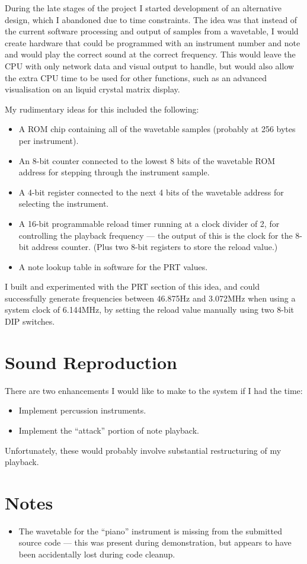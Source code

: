 During the late stages of the project I started development of an alternative design, which I 
abandoned due to time constraints.  The idea was that instead of the current software processing and 
output of samples from a wavetable, I would create hardware that could be programmed with an 
instrument number and note and would play the correct sound at the correct frequency.   This would 
leave the CPU with only network data and visual output to handle, but would also allow the extra CPU 
time to be used for other functions, such as an advanced visualisation on an liquid crystal matrix 
display.

My rudimentary ideas for this included the following:

\begin{itemize}
\item A ROM chip containing all of the wavetable samples (probably at 256 bytes per instrument).
\item An 8-bit counter connected to the lowest 8 bits of the wavetable ROM address for stepping 
through the instrument sample.
\item A 4-bit register connected to the next 4 bits of the wavetable address for selecting the 
instrument.
\item A 16-bit programmable reload timer running at a clock divider of 2, for controlling the 
playback frequency --- the output of this is the clock for the 8-bit address counter.  (Plus two 
8-bit registers to store the reload value.)
\item A note lookup table in software for the PRT values.
\end{itemize}

I built and experimented with the PRT section of this idea, and could successfully generate 
frequencies between 46.875Hz and 3.072MHz when using a system clock of 6.144MHz, by setting the 
reload value manually using two 8-bit DIP switches.

\section{Sound Reproduction}

There are two enhancements I would like to make to the system if I had the time:

\begin{itemize}
\item Implement percussion instruments.
\item Implement the ``attack'' portion of note playback.
\end{itemize}

Unfortunately, these would probably involve substantial restructuring of my playback.

\section{Notes}

\begin{itemize}
\item The wavetable for the ``piano'' instrument is missing from the submitted source code --- this 
was present during demonstration, but appears to have been accidentally lost during code cleanup.
\end{itemize}
